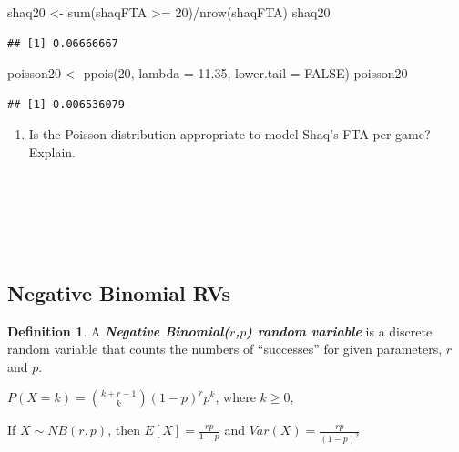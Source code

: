 \documentclass[
  11pt,
]{book}
\newenvironment{Shaded}{\begin{snugshade}}{\end{snugshade}}
\newcommand{\AttributeTok}[1]{\textcolor[rgb]{0.77,0.63,0.00}{#1}}
\newcommand{\ConstantTok}[1]{\textcolor[rgb]{0.00,0.00,0.00}{#1}}
\newcommand{\DecValTok}[1]{\textcolor[rgb]{0.00,0.00,0.81}{#1}}
\newcommand{\FloatTok}[1]{\textcolor[rgb]{0.00,0.00,0.81}{#1}}
\newcommand{\FunctionTok}[1]{\textcolor[rgb]{0.00,0.00,0.00}{#1}}
\newcommand{\NormalTok}[1]{#1}
\newcommand{\OtherTok}[1]{\textcolor[rgb]{0.56,0.35,0.01}{#1}}
\newcommand{\SpecialCharTok}[1]{\textcolor[rgb]{0.00,0.00,0.00}{#1}}
\providecommand{\tightlist}{%
  \setlength{\itemsep}{0pt}\setlength{\parskip}{0pt}}
\theoremstyle{definition}
\newtheorem{definition}{Definition}[chapter]
\theoremstyle{definition}
\theoremstyle{definition}
\theoremstyle{definition}
\theoremstyle{remark}
\begin{document}
\begin{Shaded}
\begin{Highlighting}[]
\NormalTok{shaq20 }\OtherTok{\textless{}{-}} \FunctionTok{sum}\NormalTok{(shaqFTA }\SpecialCharTok{\textgreater{}=} \DecValTok{20}\NormalTok{)}\SpecialCharTok{/}\FunctionTok{nrow}\NormalTok{(shaqFTA)}
\NormalTok{shaq20}
\end{Highlighting}
\end{Shaded}

\begin{verbatim}
## [1] 0.06666667
\end{verbatim}

\begin{Shaded}
\begin{Highlighting}[]
\NormalTok{poisson20 }\OtherTok{\textless{}{-}} \FunctionTok{ppois}\NormalTok{(}\DecValTok{20}\NormalTok{, }\AttributeTok{lambda =} \FloatTok{11.35}\NormalTok{, }\AttributeTok{lower.tail =} \ConstantTok{FALSE}\NormalTok{)}
\NormalTok{poisson20}
\end{Highlighting}
\end{Shaded}

\begin{verbatim}
## [1] 0.006536079
\end{verbatim}

\begin{enumerate}
\def\labelenumi{(\alph{enumi})}
\setcounter{enumi}{5}
\tightlist
\item
  Is the Poisson distribution appropriate to model Shaq's FTA per game? Explain.\\
  \strut \\
  \strut \\
  \strut \\
\end{enumerate}

\newpage

\hypertarget{negative-binomial-rvs}{%
\subsection{Negative Binomial RVs}\label{negative-binomial-rvs}}

\begin{definition}
A \textbf{\emph{Negative Binomial(\(r\),\(p\)) random variable}} is a discrete random variable that counts the numbers of ``successes'' for given parameters, \(r\) and \(p\).

\(P(X=k) = {k+r-1 \choose k}(1-p)^rp^k\), where \(k \geq 0,\)

If \(X \sim NB(r,p)\), then \(E[X]=\frac{rp}{1-p}\) and \(Var(X)=\frac{rp}{(1-p)^2}\)
\end{definition}
\end{document}
